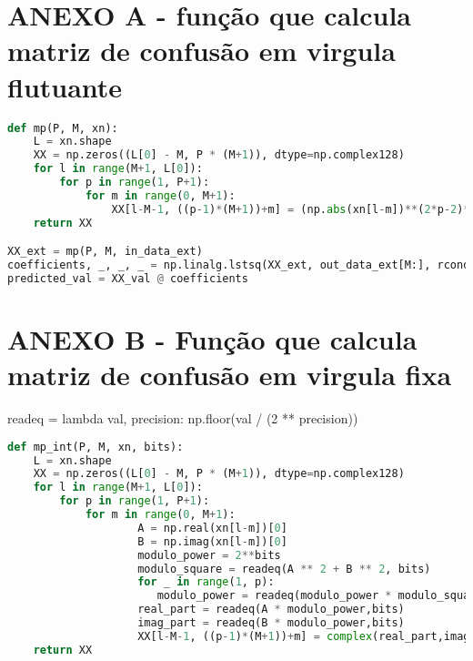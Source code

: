 \chapter*{\normalsize ANEXO A - função que calcula matriz de confusão em virgula flutuante}
\label{cod:mp}
\small %
\begin{lstlisting}[language = Python, ]
def mp(P, M, xn):
    L = xn.shape
    XX = np.zeros((L[0] - M, P * (M+1)), dtype=np.complex128)
    for l in range(M+1, L[0]):
        for p in range(1, P+1):
            for m in range(0, M+1):
                XX[l-M-1, ((p-1)*(M+1))+m] = (np.abs(xn[l-m])**(2*p-2)*(xn[l-m]))[0]
    return XX

XX_ext = mp(P, M, in_data_ext)
coefficients, _, _, _ = np.linalg.lstsq(XX_ext, out_data_ext[M:], rcond=None)
predicted_val = XX_val @ coefficients

\end{lstlisting}

\chapter*{\normalsize ANEXO B - Função que calcula matriz de confusão em virgula fixa}

readeq = lambda val, precision: np.floor(val / (2 ** precision))

\label{cod:mpint}
\small %
\begin{lstlisting}[language = Python, ]
    def mp_int(P, M, xn, bits):
    L = xn.shape
    XX = np.zeros((L[0] - M, P * (M+1)), dtype=np.complex128)
    for l in range(M+1, L[0]):
        for p in range(1, P+1):
            for m in range(0, M+1):
                    A = np.real(xn[l-m])[0]
                    B = np.imag(xn[l-m])[0]
                    modulo_power = 2**bits 
                    modulo_square = readeq(A ** 2 + B ** 2, bits)
                    for _ in range(1, p):
                       modulo_power = readeq(modulo_power * modulo_square, bits)
                    real_part = readeq(A * modulo_power,bits)
                    imag_part = readeq(B * modulo_power,bits)
                    XX[l-M-1, ((p-1)*(M+1))+m] = complex(real_part,imag_part)        
    return XX

\end{lstlisting}
